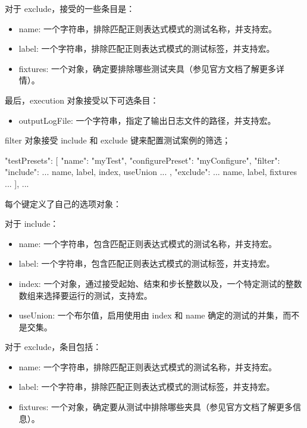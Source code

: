 对于 exclude，接受的一些条目是：

\begin{itemize}
\item
name: 一个字符串，排除匹配正则表达式模式的测试名称，并支持宏。

\item
label:  一个字符串，排除匹配正则表达式模式的测试标签，并支持宏。

\item
fixtures: 一个对象，确定要排除哪些测试夹具（参见官方文档了解更多详情）。
\end{itemize}

最后，execution 对象接受以下可选条目：

\begin{itemize}
\item
outputLogFile: 一个字符串，指定了输出日志文件的路径，并支持宏。
\end{itemize}

filter 对象接受 include 和 exclude 键来配置测试案例的筛选；

\begin{json}
    "testPresets": [
        {
            "name": "myTest",
            "configurePreset": "myConfigure",
            "filter": {
                "include": {
                    ... name, label, index, useUnion ...
                },
                "exclude": {
                    ... name, label, fixtures ...
                }
            }
        }
    ],
...
\end{json}

每个键定义了自己的选项对象：

对于 include：

\begin{itemize}
\item
name:  一个字符串，包含匹配正则表达式模式的测试名称，并支持宏。

\item
label: 一个字符串，包含匹配正则表达式模式的测试标签，并支持宏。

\item
index: 一个对象，通过接受起始、结束和步长整数以及，一个特定测试的整数数组来选择要运行的测试，支持宏。

\item
useUnion: 一个布尔值，启用使用由 index 和 name 确定的测试的并集，而不是交集。
\end{itemize}

对于 exclude，条目包括：

\begin{itemize}
\item
name: 一个字符串，排除匹配正则表达式模式的测试名称，并支持宏。

\item
label: 一个字符串，排除匹配正则表达式模式的测试标签，并支持宏。

\item
fixtures: 一个对象，确定要从测试中排除哪些夹具（参见官方文档了解更多信息）。
\end{itemize}

